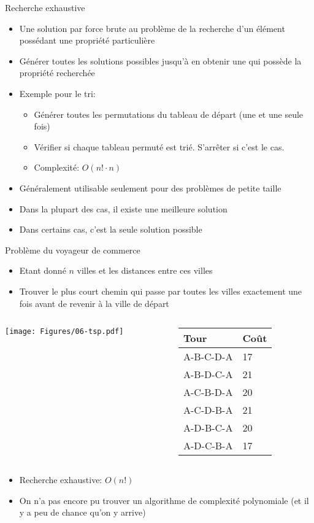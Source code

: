 \begin{frame}{Recherche exhaustive}
\begin{itemize}
\item Une solution par force brute au problème de la recherche d'un élément possédant une propriété particulière
\item Générer toutes les solutions possibles jusqu'à en obtenir une qui possède la propriété recherchée
\item Exemple pour le tri:
\begin{itemize}
\item Générer toutes les permutations du tableau de départ (une et une seule fois)
\item Vérifier si chaque tableau permuté est trié. S'arrêter si c'est le cas.
\item Complexité: $O(n!\cdot n)$
\end{itemize}
\item Généralement utilisable seulement pour des problèmes de petite taille
\item Dans la plupart des cas, il existe une meilleure solution
\item Dans certains cas, c'est la seule solution possible
\end{itemize}
\end{frame}

\begin{frame}{Problème du voyageur de commerce}
\begin{itemize}
\item Etant donné $n$ villes et les distances entre ces villes
\item Trouver le plus court chemin qui passe par toutes les villes
  exactement une fois avant de revenir à la ville de départ
\end{itemize}
\begin{columns}
\begin{column}{5cm}
\centerline{\texttt{[image: Figures/06-tsp.pdf]}}
\end{column}
\begin{column}{5cm}
\footnotesize
\begin{tabular}{ll}
Tour & Coût\\
\hline
A-B-C-D-A & 17\\
A-B-D-C-A & 21\\
A-C-B-D-A & 20\\
A-C-D-B-A & 21\\
A-D-B-C-A & 20\\
A-D-C-B-A & 17\\
\end{tabular}
\end{column}
\end{columns}

\begin{itemize}
\item Recherche exhaustive: $O(n!)$
\item On n'a pas encore pu trouver un algorithme de complexité polynomiale (et il y a peu de chance qu'on y arrive)
\end{itemize}

\end{frame}

